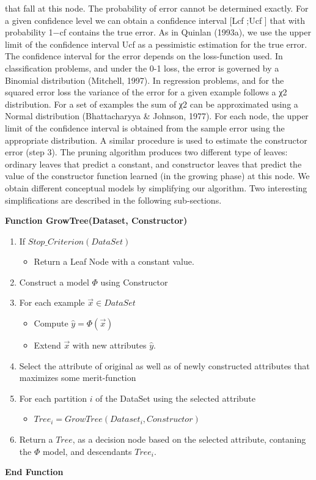 that fall at this node. The probability of error cannot be determined exactly. For a given
confidence level we can obtain a confidence interval [Lcf ;Ucf ] that with probability 1−cf
contains the true error. As in Quinlan (1993a), we use the upper limit of the confidence
interval Ucf as a pessimistic estimation for the true error.
The confidence interval for the error depends on the loss-function used. In classification
problems, and under the 0-1 loss, the error is governed by a Binomial distribution (Mitchell,
1997). In regression problems, and for the squared error loss the variance of the error for
a given example follows a χ2 distribution. For a set of examples the sum of χ2 can be
approximated using a Normal distribution (Bhattacharyya & Johnson, 1977). For each
node, the upper limit of the confidence interval is obtained from the sample error using
the appropriate distribution. A similar procedure is used to estimate the constructor error
(step 3).
The pruning algorithm produces two different type of leaves: ordinary leaves that predict
a constant, and constructor leaves that predict the value of the constructor function learned
(in the growing phase) at this node.
We obtain different conceptual models by simplifying our algorithm. Two interesting
simplifications are described in the following sub-sections.


\textbf{Function GrowTree(Dataset, Constructor)}
	\begin{enumerate}
		\item If $Stop\_Criterion(DataSet)$
		\begin{itemize}
			\item Return a Leaf Node with a constant value.
		\end{itemize}
		\item Construct a model $\Phi$ using Constructor
		\item For each example $\vec{x} \in DataSet$
		\begin{itemize}
			\item Compute $\hat y = \Phi(\vec{x})$
			\item Extend $\vec{x}$ with new attributes $\hat y$.
		\end{itemize}
		\item Select the attribute of original as well as of newly constructed attributes that maximizes some merit-function \label{selection}
		\item For each partition $i$ of the DataSet using the selected attribute
		\begin{itemize}
			\item $Tree_{i} = GrowTree (Dataset_{i},Constructor)$
		\end{itemize}
		\item Return a $Tree$, as a decision node based on the selected attribute, contaning the $\Phi$ model, and descendants $Tree_{i}$.
	\end{enumerate}
\textbf{End Function}



